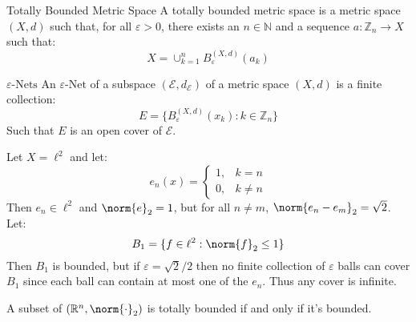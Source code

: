 \documentclass[crop=false,class=article,oneside]{standalone}
\begin{document}
            \begin{ldefinition}{Totally Bounded Metric Space}
                A totally bounded metric space is a metric
                space $(X,d)$ such that, for all $\varepsilon>0$,
                there exists an $n\in\mathbb{N}$ and a sequence
                $a:\mathbb{Z}_{n}\rightarrow{X}$ such that:
                \begin{equation}
                    X=\cup_{k=1}^{n}B_{\varepsilon}^{(X,d)}(a_{k})
                \end{equation}
            \end{ldefinition}
            \begin{ldefinition}{$\varepsilon\textrm{-Nets}$}
                An $\varepsilon\textrm{-Net}$ of a subspace
                $(\mathcal{E},d_{\mathcal{E}})$ of a
                metric space $(X,d)$ is a finite collection:
                \begin{equation}
                    E=\{B_{\varepsilon}^{(X,d)}(x_{k}):
                        k\in\mathbb{Z}_{n}\}
                \end{equation}
                Such that $E$ is an open cover of $\mathcal{E}$.
            \end{ldefinition}
            \begin{lexample}
                Let $X=\ell^{2}$ and let:
                \begin{equation}
                    e_{n}(x)=
                    \begin{cases}
                        1,&k=n\\
                        0,&k\ne{n}
                    \end{cases}
                \end{equation}
                Then $e_{n}\in\ell^{2}$ and $\norm{e}_{2}=1$,
                but for all $n\ne{m}$,
                $\norm{e_{n}-e_{m}}_{2}=\sqrt{2}$. Let:
                \begin{equation}
                    B_{1}=\{f\in\ell^{2}:\norm{f}_{2}\leq{1}\}
                \end{equation}
                Then $B_{1}$ is bounded, but if
                $\varepsilon=\sqrt{2}/2$ then no finite collection
                of $\varepsilon$ balls can cover $B_{1}$ since
                each ball can contain at most one of the
                $e_{n}$. Thus any cover is infinite.
            \end{lexample}
            \begin{theorem}
                A subset of $(\mathbb{R}^{n},\norm{\cdot}_{2})$
                is totally bounded if and only if it's bounded.
            \end{theorem}
\end{document}
